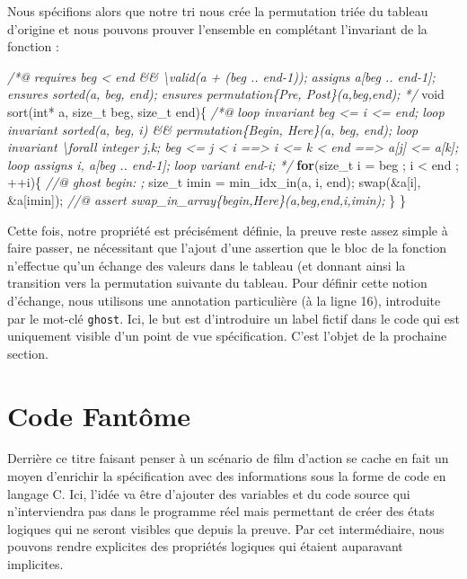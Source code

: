 \documentclass[12pt,francais,]{scrbook}
\newenvironment{Shaded}{}{}
\newcommand{\KeywordTok}[1]{\textcolor[rgb]{0.00,0.44,0.13}{\textbf{{#1}}}}
\newcommand{\DataTypeTok}[1]{\textcolor[rgb]{0.56,0.13,0.00}{{#1}}}
\newcommand{\CommentTok}[1]{\textcolor[rgb]{0.38,0.63,0.69}{\textit{{#1}}}}
\newcommand{\NormalTok}[1]{{#1}}
\begin{document}
Nous spécifions alors que notre tri nous crée la permutation triée du
tableau d'origine et nous pouvons prouver l'ensemble en complétant
l'invariant de la fonction :

\begin{footnotesize}\begin{Shaded}
\begin{Highlighting}[]
\CommentTok{/*@}
\CommentTok{  requires beg < end && \textbackslash{}valid(a + (beg .. end-1));}
\CommentTok{  assigns  a[beg .. end-1];  }
\CommentTok{  ensures sorted(a, beg, end);}
\CommentTok{  ensures permutation\{Pre, Post\}(a,beg,end);}
\CommentTok{*/}
\DataTypeTok{void} \NormalTok{sort(}\DataTypeTok{int}\NormalTok{* a, size_t beg, size_t end)\{}
  \CommentTok{/*@}
\CommentTok{    loop invariant beg <= i <= end;}
\CommentTok{    loop invariant sorted(a, beg, i) && permutation\{Begin, Here\}(a, beg, end);}
\CommentTok{    loop invariant \textbackslash{}forall integer j,k; beg <= j < i ==> i <= k < end ==> a[j] <= a[k];}
\CommentTok{    loop assigns i, a[beg .. end-1];}
\CommentTok{    loop variant end-i;}
\CommentTok{  */}
  \KeywordTok{for}\NormalTok{(size_t i = beg ; i < end ; ++i)\{}
    \CommentTok{//@ ghost begin: ;}
    \NormalTok{size_t imin = min_idx_in(a, i, end);}
    \NormalTok{swap(&a[i], &a[imin]);}
    \CommentTok{//@ assert swap_in_array\{begin,Here\}(a,beg,end,i,imin);}
  \NormalTok{\}}
\NormalTok{\}}
\end{Highlighting}
\end{Shaded}\end{footnotesize}

Cette fois, notre propriété est précisément définie, la preuve reste
assez simple à faire passer, ne nécessitant que l'ajout d'une assertion
que le bloc de la fonction n'effectue qu'un échange des valeurs dans le
tableau (et donnant ainsi la transition vers la permutation suivante du
tableau. Pour définir cette notion d'échange, nous utilisons une
annotation particulière (à la ligne 16), introduite par le mot-clé
\texttt{ghost}. Ici, le but est d'introduire un label fictif dans le
code qui est uniquement visible d'un point de vue spécification. C'est
l'objet de la prochaine section.

\section{Code Fantôme}\label{code-fantuxf4me}

Derrière ce titre faisant penser à un scénario de film d'action se cache
en fait un moyen d'enrichir la spécification avec des informations sous
la forme de code en langage C. Ici, l'idée va être d'ajouter des
variables et du code source qui n'interviendra pas dans le programme
réel mais permettant de créer des états logiques qui ne seront visibles
que depuis la preuve. Par cet intermédiaire, nous pouvons rendre
explicites des propriétés logiques qui étaient auparavant implicites.
\end{document}
